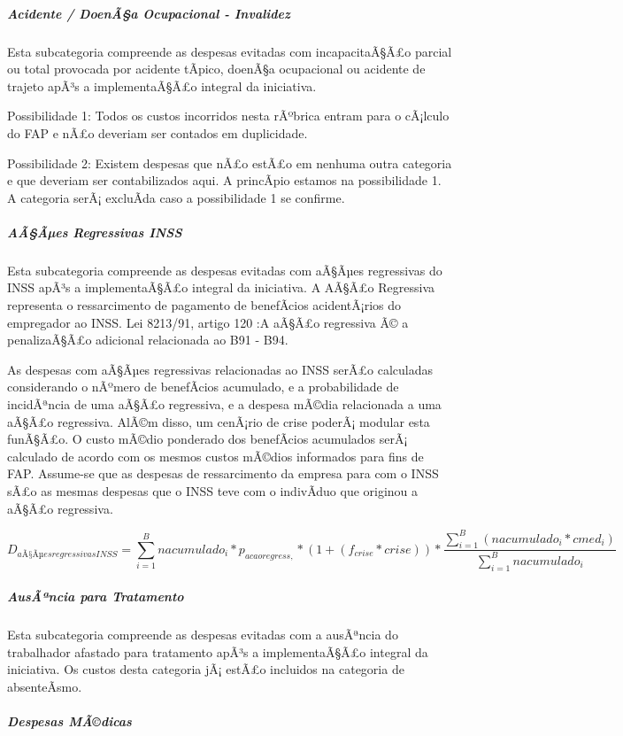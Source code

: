 \documentclass[]{article}
\let\oldsubparagraph\subparagraph
\renewcommand{\subparagraph}[1]{\oldsubparagraph{#1}\mbox{}}
\begin{document}
\subparagraph{Acidente / DoenÃ§a Ocupacional -
Invalidez}\label{acidente-doenaa-ocupacional---invalidez}

Esta subcategoria compreende as despesas evitadas com incapacitaÃ§Ã£o
parcial ou total provocada por acidente tÃ­pico, doenÃ§a ocupacional ou
acidente de trajeto apÃ³s a implementaÃ§Ã£o integral da iniciativa.

Possibilidade 1: Todos os custos incorridos nesta rÃºbrica entram para o
cÃ¡lculo do FAP e nÃ£o deveriam ser contados em duplicidade.

Possibilidade 2: Existem despesas que nÃ£o estÃ£o em nenhuma outra
categoria e que deveriam ser contabilizados aqui. A princÃ­pio estamos
na possibilidade 1. A categoria serÃ¡ excluÃ­da caso a possibilidade 1
se confirme.

\subparagraph{AÃ§Ãµes Regressivas INSS}\label{aaaes-regressivas-inss}

Esta subcategoria compreende as despesas evitadas com aÃ§Ãµes
regressivas do INSS apÃ³s a implementaÃ§Ã£o integral da iniciativa. A
AÃ§Ã£o Regressiva representa o ressarcimento de pagamento de benefÃ­cios
acidentÃ¡rios do empregador ao INSS. Lei 8213/91, artigo 120 :A aÃ§Ã£o
regressiva Ã© a penalizaÃ§Ã£o adicional relacionada ao B91 - B94.

As despesas com aÃ§Ãµes regressivas relacionadas ao INSS serÃ£o
calculadas considerando o nÃºmero de benefÃ­cios acumulado, e a
probabilidade de incidÃªncia de uma aÃ§Ã£o regressiva, e a despesa
mÃ©dia relacionada a uma aÃ§Ã£o regressiva. AlÃ©m disso, um cenÃ¡rio de
crise poderÃ¡ modular esta funÃ§Ã£o. O custo mÃ©dio ponderado dos
benefÃ­cios acumulados serÃ¡ calculado de acordo com os mesmos custos
mÃ©dios informados para fins de FAP. Assume-se que as despesas de
ressarcimento da empresa para com o INSS sÃ£o as mesmas despesas que o
INSS teve com o indivÃ­duo que originou a aÃ§Ã£o regressiva.

\[D_{aÃ§Ãµes regressivas INSS} =  \sum_{i=1}^{B} nacumulado_i * p_{acaoregress,} * (1+(f_{crise}*crise))  * \frac{\sum_{i=1}^{B} (nacumulado_i *cmed_{i})}{\sum_{i=1}^{B} nacumulado_i} \]

\subparagraph{AusÃªncia para Tratamento}\label{ausancia-para-tratamento}

Esta subcategoria compreende as despesas evitadas com a ausÃªncia do
trabalhador afastado para tratamento apÃ³s a implementaÃ§Ã£o integral da
iniciativa. Os custos desta categoria jÃ¡ estÃ£o incluidos na categoria
de absenteÃ­smo.

\subparagraph{Despesas MÃ©dicas}\label{despesas-madicas}
\end{document}
